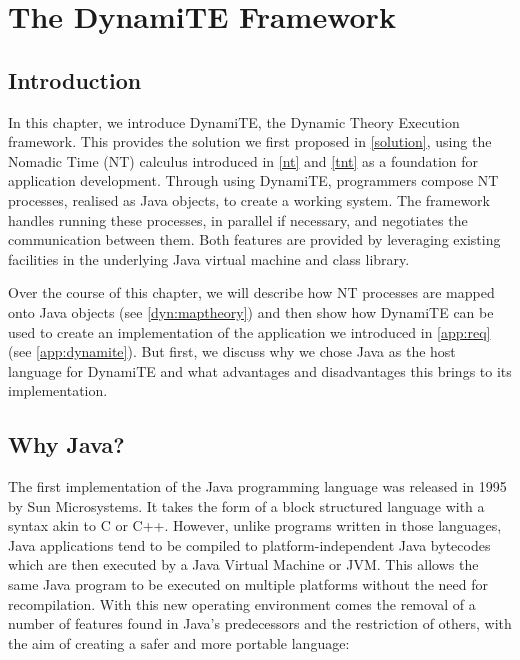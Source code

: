 
\chapter{The DynamiTE Framework}
\label{dynamite}

\section{Introduction}

In this chapter, we introduce DynamiTE, the Dynamic Theory Execution
framework.  This provides the solution we first proposed in
\ref{solution}, using the Nomadic Time (NT) calculus introduced in
\ref{nt} and \ref{tnt} as a foundation for application development.
Through using DynamiTE, programmers compose NT processes, realised as
Java objects, to create a working system.  The framework handles
running these processes, in parallel if necessary, and negotiates the
communication between them.  Both features are provided by leveraging
existing facilities in the underlying Java virtual machine and class
library.

Over the course of this chapter, we will describe how NT processes are
mapped onto Java objects (see \ref{dyn:maptheory}) and then show how
DynamiTE can be used to create an implementation of the application we
introduced in \ref{app:req} (see \ref{app:dynamite}).  But first, we
discuss why we chose Java as the host language for DynamiTE and what
advantages and disadvantages this brings to its implementation.

\section{Why Java?}

The first implementation of the Java programming language was released
in 1995 by Sun Microsystems.  It takes the form of a block structured
language with a syntax akin to C or C++.  However, unlike programs
written in those languages, Java applications tend to be compiled to
platform-independent Java bytecodes which are then executed by a Java
Virtual Machine or JVM.  This allows the same Java program to be
executed on multiple platforms without the need for recompilation.
With this new operating environment comes the removal of a number of
features found in Java's predecessors and the restriction of others,
with the aim of creating a safer and more portable language:

